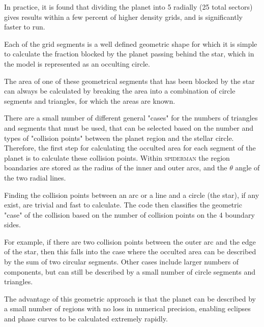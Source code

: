 \documentclass[a4paper,fleqn,usenatbib]{mnras}
\begin{document}
In practice, it is found that dividing the planet into 5 radially (25 total sectors) gives results within a few percent of higher density grids, and is significantly faster to run.

Each of the grid segments is a well defined geometric shape for which it is simple to calculate the fraction blocked by the planet passing behind the star, which in the model is represented as an occulting circle.

The area of one of these geometrical segments that has been blocked by the star can always be calculated by breaking the area into a combination of circle segments and triangles, for which the areas are known.

There are a small number of different general "cases" for the numbers of triangles and segments that must be used, that can be selected based on the number and types of "collision points" between the planet region and the stellar circle. Therefore, the first step for calculating the occulted area for each segment of the planet is to calculate these collision points. Within \textsc{spiderman} the region boandaries are stored as the radius of the inner and outer arcs, and the $\theta$ angle of the two radial lines.

Finding the collision points between an arc or a line and a circle (the star), if any exist, are trivial and fast to calculate. The code then classifies the geometric "case" of the collision based on the number of collision points on the 4 boundary sides.

For example, if there are two collision points between the outer arc and the edge of the star, then this falls into the case where the occulted area can be described by the sum of two circular segments. Other cases include larger numbers of components, but can still be described by a small number of circle segments and triangles.

The advantage of this geometric approach is that the planet can be described by a small number of regions with no loss in numerical precision, enabling eclipses and phase curves to be calculated extremely rapidly.
\end{document}
